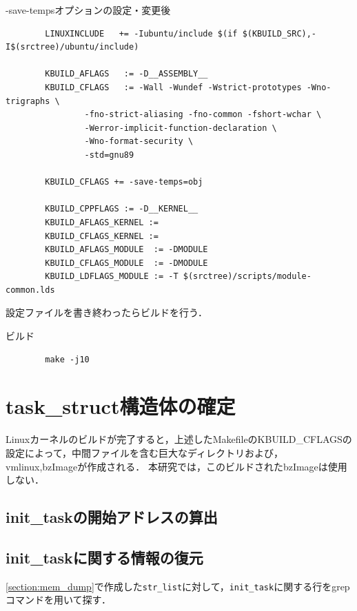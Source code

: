 \begin{itembox}[l]{-save-tempsオプションの設定・変更後}
    \begin{verbatim}
        LINUXINCLUDE   += -Iubuntu/include $(if $(KBUILD_SRC),-I$(srctree)/ubuntu/include)

        KBUILD_AFLAGS   := -D__ASSEMBLY__
        KBUILD_CFLAGS   := -Wall -Wundef -Wstrict-prototypes -Wno-trigraphs \
                -fno-strict-aliasing -fno-common -fshort-wchar \
                -Werror-implicit-function-declaration \
                -Wno-format-security \
                -std=gnu89

        KBUILD_CFLAGS += -save-temps=obj

        KBUILD_CPPFLAGS := -D__KERNEL__
        KBUILD_AFLAGS_KERNEL :=
        KBUILD_CFLAGS_KERNEL :=
        KBUILD_AFLAGS_MODULE  := -DMODULE
        KBUILD_CFLAGS_MODULE  := -DMODULE
        KBUILD_LDFLAGS_MODULE := -T $(srctree)/scripts/module-common.lds
    \end{verbatim}
\end{itembox}

設定ファイルを書き終わったらビルドを行う．

\begin{itembox}[l]{ビルド}
    \begin{verbatim}
        make -j10
    \end{verbatim}
\end{itembox}

\section{task_struct構造体の確定}

Linuxカーネルのビルドが完了すると，上述したMakefileのKBUILD_CFLAGSの設定によって，中間ファイルを含む巨大なディレクトリおよび，vmlinux,bzImageが作成される．
本研究では，このビルドされたbzImageは使用しない．

\subsection{init_taskの開始アドレスの算出}

\subsection{init\_taskに関する情報の復元}

\ref{section:mem_dump}で作成した\verb|str_list|に対して，\verb|init_task|に関する行をgrepコマンドを用いて探す．

